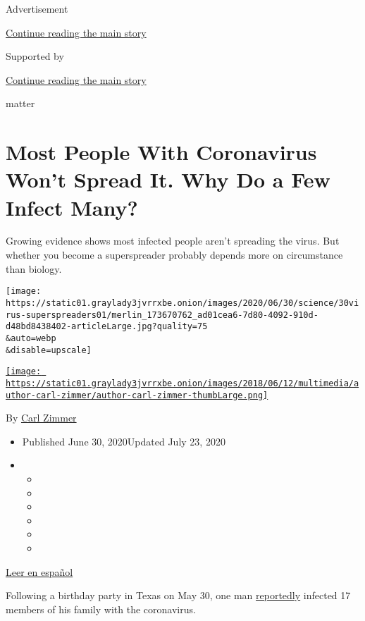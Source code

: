 Advertisement

\protect\hyperlink{after-top}{Continue reading the main story}

Supported by

\protect\hyperlink{after-sponsor}{Continue reading the main story}

matter

\hypertarget{most-people-with-coronavirus-wont-spread-it-why-do-a-few-infect-many}{%
\section{Most People With Coronavirus Won't Spread It. Why Do a Few
Infect
Many?}\label{most-people-with-coronavirus-wont-spread-it-why-do-a-few-infect-many}}

Growing evidence shows most infected people aren't spreading the virus.
But whether you become a superspreader probably depends more on
circumstance than biology.

\texttt{[image: https://static01.graylady3jvrrxbe.onion/images/2020/06/30/science/30virus-superspreaders01/merlin\_173670762\_ad01cea6-7d80-4092-910d-d48bd8438402-articleLarge.jpg?quality=75\\\&auto=webp\\\&disable=upscale]}

\href{https://www.nytimes3xbfgragh.onion/by/carl-zimmer}{\texttt{[image: https://static01.graylady3jvrrxbe.onion/images/2018/06/12/multimedia/author-carl-zimmer/author-carl-zimmer-thumbLarge.png]}}

By \href{https://www.nytimes3xbfgragh.onion/by/carl-zimmer}{Carl Zimmer}

\begin{itemize}
\item
  Published June 30, 2020Updated July 23, 2020
\item
  \begin{itemize}
  \item
  \item
  \item
  \item
  \item
  \item
  \end{itemize}
\end{itemize}

\href{https://www.nytimes3xbfgragh.onion/es/2020/07/03/espanol/el-misterio-de-los-superpropagadores-de-coronavirus.html}{Leer
en español}

Following a birthday party in Texas on May 30, one man
\href{https://apnews.com/d9a6ca7eef083315648003509d07515a}{reportedly}
infected 17 members of his family with the coronavirus.

